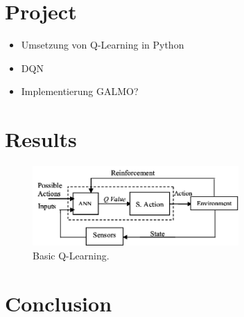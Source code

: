\documentclass[a4paper]{article}
\begin{document}
	
	\section{Project}
	\label{sec:project}
	\begin{itemize}
		\item Umsetzung von Q-Learning in Python
		\item DQN
		\item Implementierung GALMO?
	\end{itemize}
	
	
	\section{Results}
	\label{sec:results}
	
	
	\begin{figure}[t]
		\centering
		\includegraphics[angle=0,width=0.7\textwidth]{./figs/RL_ANN.png}
		\caption{\label{fig:qlearn}Basic Q-Learning.}
	\end{figure}
	
	
	
	\section{Conclusion}
	
	
	\footnotesize
	
	
	
\end{document}
